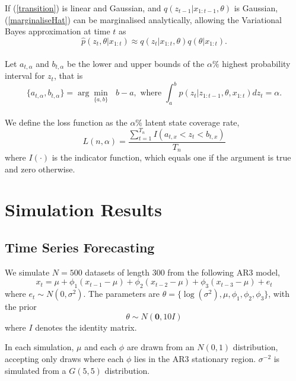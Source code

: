 \documentclass[12pt,a4paper]{article}\usepackage[]{graphicx}\usepackage[]{color}
\begin{document}
If (\ref{transition}) is linear and Gaussian, and  $q(z_{t-1} | x_{1:t-1}, \theta)$ is Gaussian, (\ref{marginaliseHat}) can be marginalised analytically, allowing the Variational Bayes approximation at time $t$ as
\begin{equation}
\label{UVBfilter}
\hat{p}(z_t, \theta | x_{1:t}) \approx q(z_{t} | x_{1:t}, \theta)q(\theta|x_{1:t}).
\end{equation}
\\

Let $a_{t, \alpha}$ and $b_{t, \alpha}$ be the lower and upper bounds of the $\alpha\%$ highest probability interval for $z_t$, that is
\begin{equation}
\label{HPI}
\{a_{t, \alpha}, b_{t, \alpha}\} = \arg \underset{\{a, b\}}{\min}\mbox{ } b - a, \mbox{ where } \int_a^b p(z_t | z_{1:t-1}, \theta, x_{1:t})dz_t = \alpha.
\end{equation}
\\

We define the loss function as the $\alpha\%$ latent state coverage rate, 
\begin{equation}
\label{coverage}
L(n, \alpha) = \frac{\sum_{t=1}^{T_n} I(a_{t, x} < z_t < b_{t, x})}{T_n}
\end{equation}
where $I(\cdot)$ is the indicator function, which equals one if the argument is true and zero otherwise.

\section{Simulation Results}

\subsection{Time Series Forecasting}

We simulate $N = 500$ datasets of length $300$ from the following AR3 model,
\begin{equation}
\label{AR3}
x_t = \mu + \phi_1 (x_{t-1} - \mu) + \phi_2 (x_{t-2} - \mu) + \phi_3 (x_{t-3} - \mu) + e_t
\end{equation}
where $e_t \sim N(0, \sigma^2)$. 
The parameters are $\theta = \{\log(\sigma^2), \mu, \phi_1, \phi_2, \phi_3 \}$, with the prior
\begin{equation}
\label{prior}
\theta \sim N(\boldsymbol{0}, 10 I)
\end{equation}
where $I$ denotes the identity matrix.

In each simulation, $\mu$ and each $\phi$ are drawn from an $N(0, 1)$ distribution, accepting only draws where each $\phi$ lies in the AR3 stationary region. $\sigma^{-2}$ is simulated from a $G(5, 5)$ distribution.
\\
\end{document}
